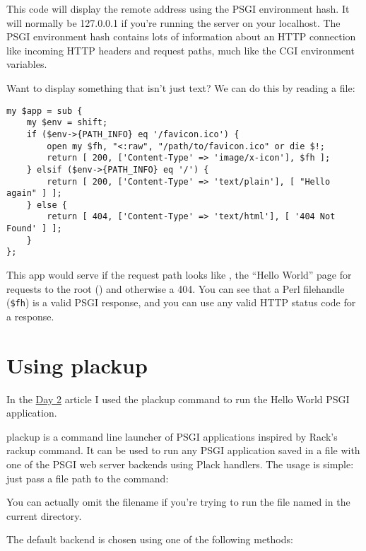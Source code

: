 This code will display the remote address using the PSGI environment
hash. It will normally be 127.0.0.1 if you're running the server on your
localhost. The PSGI environment hash contains lots of information about
an HTTP connection like incoming HTTP headers and request paths, much
like the CGI environment variables.

Want to display something that isn't just text? We can do this by
reading a file:

\begin{lstlisting}
my $app = sub {
    my $env = shift;
    if ($env->{PATH_INFO} eq '/favicon.ico') {
        open my $fh, "<:raw", "/path/to/favicon.ico" or die $!;
        return [ 200, ['Content-Type' => 'image/x-icon'], $fh ];
    } elsif ($env->{PATH_INFO} eq '/') {
        return [ 200, ['Content-Type' => 'text/plain'], [ "Hello again" ] ];
    } else {
        return [ 404, ['Content-Type' => 'text/html'], [ '404 Not Found' ] ];
    }
};
\end{lstlisting}

This app would serve  if the request path looks like
, the ``Hello World'' page for requests to the root (\uri{/}) and
otherwise a 404. You can see that a Perl filehandle (\lstinline!$fh!) is
a valid PSGI response, and you can use any valid HTTP status code for a
response.

\chapter{Using plackup}\label{day-3-using-plackup}

In the
\href{http://advent.plackperl.org/2009/12/day-2-hello-world.html}{Day 2}
article I used the plackup command to run the Hello World PSGI
application.

plackup is a command line launcher of PSGI applications inspired by
Rack's rackup command. It can be used to run any PSGI application saved
in a  file with one of the PSGI web server backends using Plack
handlers. The usage is simple: just pass a  file path to the
command:


You can actually omit the filename if you're trying to run the file
named  in the current directory.

The default backend is chosen using one of the following methods:

